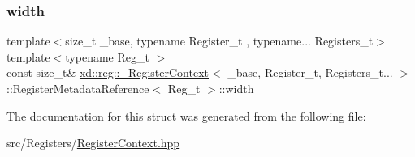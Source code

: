 \subsubsection{\texorpdfstring{width}{width}}
{\footnotesize\ttfamily template$<$size\+\_\+t \+\_\+base, typename Register\+\_\+t , typename... Registers\+\_\+t$>$ \\
template$<$typename Reg\+\_\+t $>$ \\
const size\+\_\+t\& \mbox{\hyperlink{classxd_1_1reg_1_1___register_context}{xd\+::reg\+::\+\_\+\+Register\+Context}}$<$ \+\_\+base, Register\+\_\+t, Registers\+\_\+t... $>$\+::Register\+Metadata\+Reference$<$ Reg\+\_\+t $>$\+::width}



The documentation for this struct was generated from the following file\+:\begin{DoxyCompactItemize}
\item 
src/\+Registers/\mbox{\hyperlink{_register_context_8hpp}{Register\+Context.\+hpp}}\end{DoxyCompactItemize}
